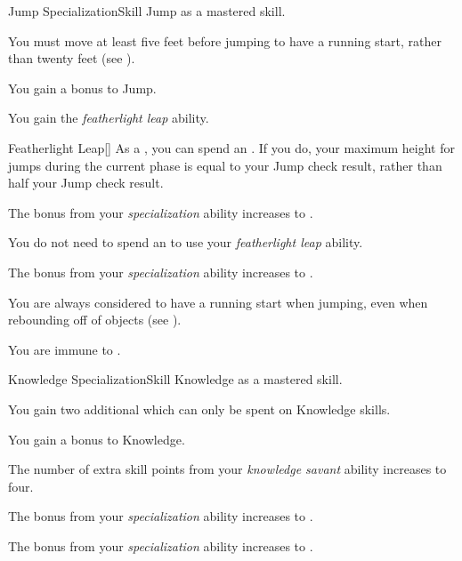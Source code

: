     \begin{feat}{Jump Specialization}{Skill}
        \featpre Jump as a mastered skill.

         You must move at least five feet before jumping to have a running start, rather than twenty feet (see ).

         You gain a  bonus to Jump.

         You gain the \textit{featherlight leap} ability.
        \begin{ability}{Featherlight Leap}[]
            As a , you can spend an .
            If you do, your maximum height for jumps during the current phase is equal to your Jump check result, rather than half your Jump check result.
        \end{ability}

         The bonus from your \textit{specialization} ability increases to .

         You do not need to spend an  to use your \textit{featherlight leap} ability.

         The bonus from your \textit{specialization} ability increases to .

         You are always considered to have a running start when jumping, even when rebounding off of objects (see ).

         You are immune to .
    \end{feat}

    \begin{feat}{Knowledge Specialization}{Skill}
        \featpre Knowledge as a mastered skill.

         You gain two additional  which can only be spent on Knowledge skills.

         You gain a  bonus to Knowledge.

         The number of extra skill points from your \textit{knowledge savant} ability increases to four.

         The bonus from your \textit{specialization} ability increases to .

         The bonus from your \textit{specialization} ability increases to .
    \end{feat}


